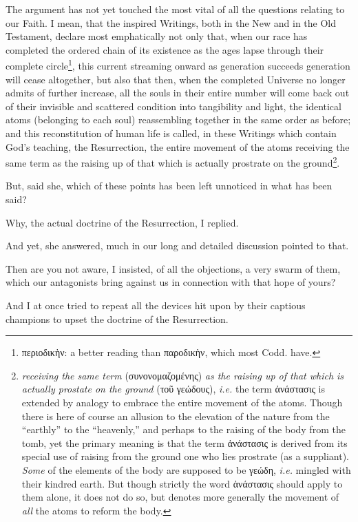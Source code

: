 The argument has not yet touched the most vital of all the questions relating to our Faith. I mean, that the inspired Writings, both in the New and in the Old Testament, declare most emphatically not only that, when our race has completed the ordered chain of its existence as the ages lapse through their complete circle\footnote{\textgreek{περιοδικὴν}: a better reading than \textgreek{παροδικὴν}, which most Codd. have.}, this current streaming onward as generation succeeds generation will cease altogether, but also that then, when the completed Universe no longer admits of further increase, all the souls in their entire number will come back out of their invisible and scattered condition into tangibility and light, the identical atoms (belonging to each soul) reassembling together in the same order as before; and this reconstitution of human life is called, in these Writings which contain God’s teaching, the Resurrection, the entire movement of the atoms receiving the same term as the raising up of that which is actually prostrate on the ground\footnote{\emph{receiving the same term} (\textgreek{συνονομαζομένης}) \emph{as the raising up of that which is actually prostate on the ground} (\textgreek{τοῦ γεώδους}), \emph{i.e.} the term \textgreek{ἀνάστασις} is extended by analogy to embrace the entire movement of the atoms. Though there is here of course an allusion to the elevation of the nature from the “earthly” to the “heavenly,” and perhaps to the raising of the body from the tomb, yet the primary meaning is that the term \textgreek{ἀνάστασις} is derived from its special use of raising from the ground one who lies prostrate (as a suppliant). \emph{Some} of the elements of the body are supposed to be \textgreek{γεώδη}, \emph{i.e.} mingled with their kindred earth. But though strictly the word \textgreek{ἀνάστασις} should apply to them alone, it does not do so, but denotes more generally the movement of \emph{all} the atoms to reform the body.}.

But, said she, which of these points has been left unnoticed in what has been said?

Why, the actual doctrine of the Resurrection, I replied.

And yet, she answered, much in our long and detailed discussion pointed to that.

Then are you not aware, I insisted, of all the objections, a very swarm of them, which our antagonists bring against us in connection with that hope of yours?

And I at once tried to repeat all the devices hit upon by their captious champions to upset the doctrine of the Resurrection.

